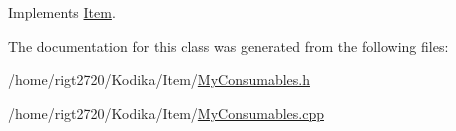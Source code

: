 Implements \hyperlink{classItem_abd3f52dd7fa25d497f2070e95d44ac03}{Item}.



The documentation for this class was generated from the following files\-:\begin{DoxyCompactItemize}
\item 
/home/rigt2720/\-Kodika/\-Item/\hyperlink{MyConsumables_8h}{My\-Consumables.\-h}\item 
/home/rigt2720/\-Kodika/\-Item/\hyperlink{MyConsumables_8cpp}{My\-Consumables.\-cpp}\end{DoxyCompactItemize}
